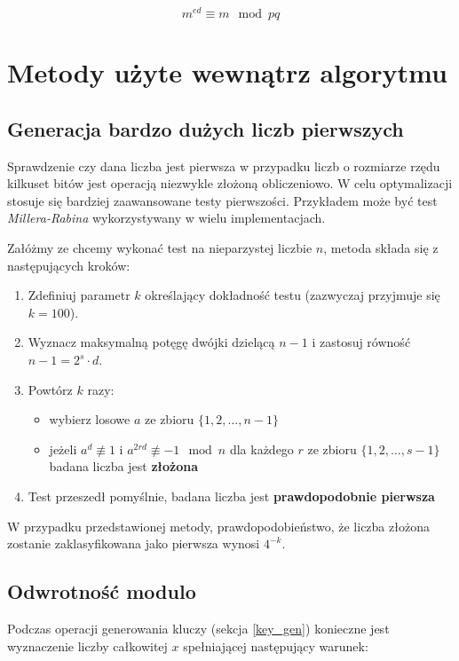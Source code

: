 \documentclass[10pt,a4paper]{article}
\begin{document}
\begin{equation}
m^{ed} \equiv m \mod pq
\end{equation}


\section{Metody użyte wewnątrz algorytmu}

\subsection{Generacja bardzo dużych liczb pierwszych}

Sprawdzenie czy dana liczba jest pierwsza w przypadku liczb o rozmiarze rzędu kilkuset bitów jest operacją niezwykle złożoną obliczeniowo. W celu optymalizacji stosuje się bardziej zaawansowane testy pierwszości. Przykładem może być test \textit{Millera-Rabina} wykorzystywany w wielu implementacjach.\\ 


\begin{samepage}
\noindent Załóżmy ze chcemy wykonać test na nieparzystej liczbie $n$, metoda składa się z następujących kroków:

\begin{enumerate}
\item Zdefiniuj parametr $k$ określający dokładność testu (zazwyczaj przyjmuje się $k=100$).
\item Wyznacz maksymalną potęgę dwójki dzielącą $n-1$ i zastosuj równość $n-1 = 2^s \cdot d$.
\item {Powtórz $k$ razy:
	\begin{itemize}
		\item wybierz losowe $a$ ze zbioru $\{1,2,\ldots,n-1\}$
		\item jeżeli $a^d \not\equiv 1$ i $a^{2rd} \not\equiv -1 \mod n$ dla każdego $r$ ze zbioru $\{1,2,\ldots,s-1\}$ badana liczba jest \textbf{złożona}
	\end{itemize}
	}
\item Test przeszedł pomyślnie, badana liczba jest \textbf{prawdopodobnie pierwsza}
\end{enumerate}

\end{samepage}

\noindent W przypadku przedstawionej metody, prawdopodobieństwo, że liczba złożona zostanie zaklasyfikowana jako pierwsza wynosi $4^{-k}$.

\subsection{Odwrotność modulo} \label{mod_inv}
Podczas operacji generowania kluczy (sekcja \ref{key_gen}) konieczne jest wyznaczenie liczby całkowitej $x$ spełniającej następujący warunek:
\end{document}
